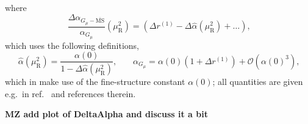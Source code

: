 where
\begin{equation}
\frac{\Delta \alpha_{G_\mu-\overline{\textrm{MS}}}}{\alpha_{G_\mu}}(\mu_\mathrm{R}^2) = 
\left(\Delta r^{(1)} - \Delta \hat{\alpha} (\mu_\mathrm{R}^2) + \ldots \right) \text{,} \label{eq:consistency-condition}
\end{equation}
which uses the following definitions,
\begin{equation}
\hat{\alpha} (\mu_\mathrm{R}^2) = \frac{\alpha(0)}{1 - \Delta \hat{\alpha} (\mu_\mathrm{R}^2)} \text{,} \qquad \alpha_{G_\mu} = \alpha(0) \left( 1 + \Delta r^{(1)} \right) + \mathcal{O} (\alpha(0)^3) \text{,}
\end{equation}
which in make use of the fine-structure constant $\alpha(0)$; all quantities are given e.g.\ in ref.~\cite{Denner:2019vbn} and references therein.

{\bf MZ add plot of DeltaAlpha and discuss it a bit}
